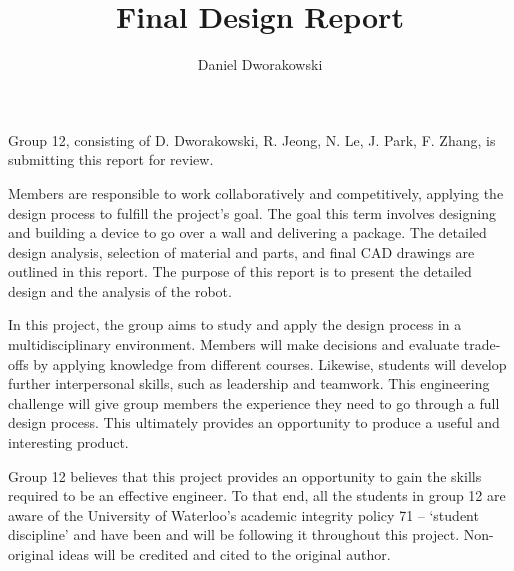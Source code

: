 \documentclass[ece]{uw-wkrpt}
\begin{document}

\title{Final Design Report}

\author{Daniel Dworakowski}
\address{University of Waterloo,\\*
        Waterloo, ON\ \ N2L 3G1}
\employeraddress{}
\maketitle

\frontmatter

% 
\begin{letter}
Group 12, consisting of D. Dworakowski, R. Jeong, N. Le, J. Park, F. Zhang, is submitting this report for review.

Members are responsible to work collaboratively and competitively, applying the design process to fulfill the project’s goal. The goal this term involves designing and building a device to go over a wall and delivering a package. The detailed design analysis, selection of material and parts, and final CAD drawings are outlined in this report. The purpose of this report is to present the detailed design and the analysis of the robot.

In this project, the group aims to study and apply the design process in a multidisciplinary environment. Members will make decisions and evaluate trade-offs by applying knowledge from different courses. Likewise, students will develop further interpersonal skills, such as leadership and teamwork. This engineering challenge will give group members the experience they need to go through a full design process. This ultimately provides an opportunity to produce a useful and interesting product.

Group 12 believes that this project provides an opportunity to gain the skills required to be an effective engineer. To that end, all the students in group 12 are aware of the University of Waterloo’s academic integrity policy 71 – ‘student discipline’ and have been and will be following it throughout this project. Non-original ideas will be credited and cited to the original author.

\end{letter}
% 
\end{document}
